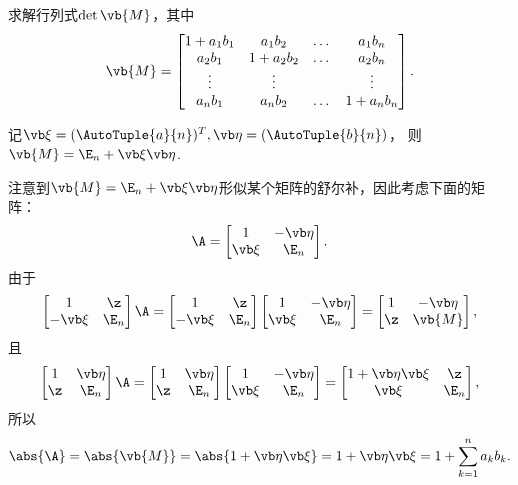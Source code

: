 \begin{example}
\def\M{\vb{M}}
求解行列式\(\det \M\)，其中\[
	\M = \begin{bmatrix}
		1+a_1 b_1 & a_1 b_2 & \dots & a_1 b_n \\
		a_2 b_1 & 1+a_2 b_2 & \dots & a_2 b_n \\
		\vdots & \vdots & & \vdots \\
		a_n b_1 & a_n b_2 & \dots & 1+a_n b_n
	\end{bmatrix}.
\]
\begin{solution}
记\(\a = (\AutoTuple{a}{n})^T,
\b = (\AutoTuple{b}{n})\)，
则\(\M = \E_n + \a\b\).

注意到\(\M = \E_n + \a\b\)形似某个矩阵的舒尔补，因此考虑下面的矩阵：\[
	\A = \begin{bmatrix}
		1 & -\b \\
		\a & \E_n
	\end{bmatrix}.
\]由于\[
	\begin{bmatrix}
		1 & \z \\
		-\a & \E_n
	\end{bmatrix} \A
	= \begin{bmatrix}
		1 & \z \\
		-\a & \E_n
	\end{bmatrix}
	\begin{bmatrix}
		1 & -\b \\
		\a & \E_n
	\end{bmatrix}
	= \begin{bmatrix}
		1 & -\b \\
		\z & \M
	\end{bmatrix},
\]
且\[
	\begin{bmatrix}
		1 & \b \\
		\z & \E_n
	\end{bmatrix} \A
	= \begin{bmatrix}
		1 & \b \\
		\z & \E_n
	\end{bmatrix}
	\begin{bmatrix}
		1 & -\b \\
		\a & \E_n
	\end{bmatrix}
	= \begin{bmatrix}
		1+\b\a & \z \\
		\a & \E_n
	\end{bmatrix},
\]
所以\[
	\abs{\A}
	= \abs{\M}
	= \abs{1+\b\a}
	= 1+\b\a
	= 1 + \sum_{k=1}^n a_k b_k.
\]
\end{solution}
\end{example}
